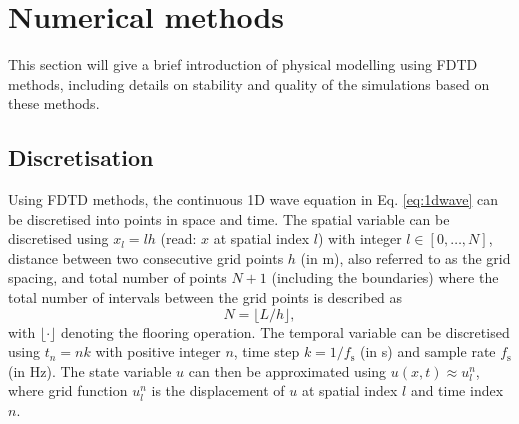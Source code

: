 \section{Numerical methods}\label{sec:FDTD}
This section will give a brief introduction of physical modelling using FDTD methods, including details on stability and quality of the simulations based on these methods.

\subsection{Discretisation}
Using FDTD methods, the continuous 1D wave equation in Eq. \eqref{eq:1dwave} can be discretised into points in space and time. The spatial variable can be discretised using $x_l = lh$ (read: $x$ at spatial index $l$) with integer $l \in [0, \hdots, N]$, distance between two consecutive grid points $h$ (in m), also referred to as the grid spacing, and total number of points $N + 1$ (including the boundaries) where the total number of intervals between the grid points is described as
\begin{equation}\label{eq:numberOfIntervals}
    N = \lfloor L/h\rfloor,
\end{equation}
with $\lfloor \cdot \rfloor$ denoting the flooring operation. The temporal variable can be discretised using $t_n = nk$ with positive integer $n$, time step $k = 1/f_\text{s}$ (in s) and sample rate $f_\text{s}$ (in Hz). The state variable $u$ can then be approximated using $u(x,t) \approx u_l^n$, where grid function $u_l^n$ is the displacement of $u$ at spatial index $l$ and time index $n$. %

